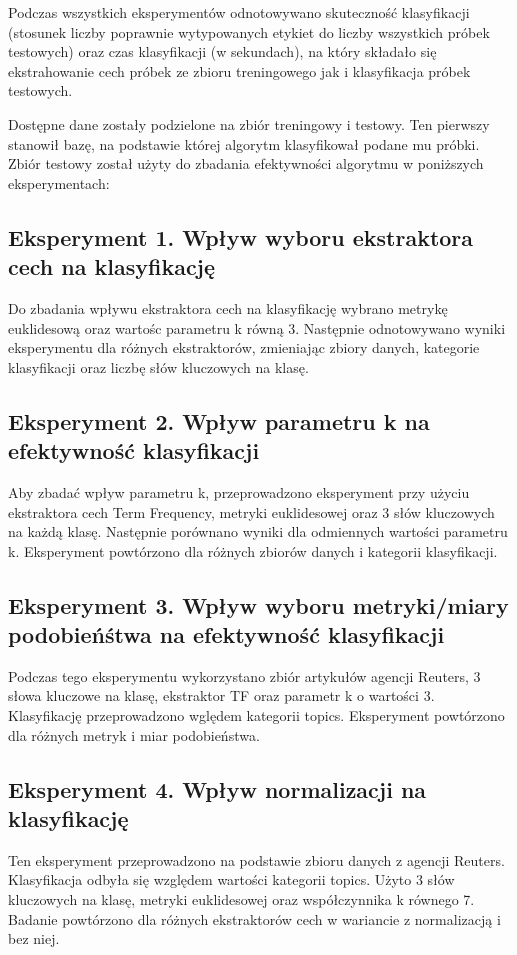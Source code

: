 \documentclass{classrep}
\begin{document}
Podczas wszystkich eksperymentów odnotowywano skuteczność klasyfikacji (stosunek liczby poprawnie wytypowanych etykiet do liczby wszystkich próbek testowych) oraz czas klasyfikacji (w sekundach), na który składało się ekstrahowanie cech próbek ze zbioru treningowego jak i klasyfikacja próbek testowych.

Dostępne dane zostały podzielone na zbiór treningowy i testowy. Ten pierwszy stanowił bazę, na podstawie której algorytm klasyfikował podane mu próbki. Zbiór testowy został użyty do zbadania efektywności algorytmu w poniższych eksperymentach:
\subsection{Eksperyment 1. Wpływ wyboru ekstraktora cech na klasyfikację}
Do zbadania wpływu ekstraktora cech na klasyfikację wybrano metrykę euklidesową oraz wartośc parametru k równą 3. Następnie odnotowywano wyniki eksperymentu dla różnych ekstraktorów, zmieniając zbiory danych, kategorie klasyfikacji oraz liczbę słów kluczowych na klasę. 
\subsection{Eksperyment 2. Wpływ parametru k na efektywność klasyfikacji}
Aby zbadać wpływ parametru k, przeprowadzono eksperyment przy użyciu ekstraktora cech Term Frequency, metryki euklidesowej oraz 3 słów kluczowych na każdą klasę. Następnie porównano wyniki dla odmiennych wartości parametru k. Eksperyment powtórzono dla różnych zbiorów danych i kategorii klasyfikacji. 
\subsection{Eksperyment 3. Wpływ wyboru metryki/miary podobieńśtwa na efektywność klasyfikacji}
Podczas tego eksperymentu wykorzystano zbiór artykułów agencji Reuters, 3 słowa kluczowe na klasę, ekstraktor TF oraz parametr k o wartości 3. Klasyfikację przeprowadzono wględem kategorii topics. Eksperyment powtórzono dla różnych metryk i miar podobieństwa.
\subsection{Eksperyment 4. Wpływ normalizacji na klasyfikację}
Ten eksperyment przeprowadzono na podstawie zbioru danych z agencji Reuters. Klasyfikacja odbyła się względem wartości kategorii topics. Użyto 3 słów kluczowych na klasę, metryki euklidesowej oraz współczynnika k równego 7. Badanie powtórzono dla różnych ekstraktorów cech w wariancie z normalizacją i bez niej.
\newpage
\end{document}
